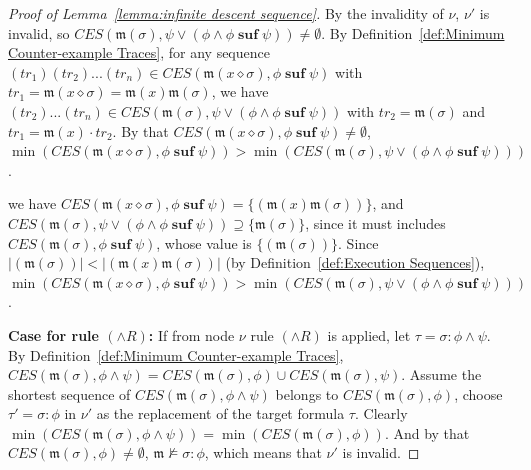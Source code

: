 \documentclass[manuscript,screen]{acmart}
\newcommand{\mfr}[1]{\mathfrak{#1}}
\newcommand{\lm}[0]{\mfr{m}}
\newcommand{\EX}[0]{\textit{CES}}
\newcommand{\cat}[0]{\diamond}
\DeclareMathOperator{\ofst}{\mathbf{f}}
\DeclareMathOperator{\osuf}{\mathbf{suf}}
\begin{document}
\begin{proof}[Proof of Lemma~\ref{lemma:infinite descent sequence}]
    By the invalidity of $\nu$, $\nu'$ is invalid, so $\EX(\lm(\sigma), \psi\vee (\phi\wedge \phi\osuf\psi))\neq \emptyset$. 
    By Definition~\ref{def:Minimum Counter-example Traces}, 
    for any sequence $(tr_1)(tr_2)...(tr_n)\in \EX(\lm(x\cat \sigma), \phi\osuf\psi)$ with $tr_1 = \lm(x\cat \sigma) = \lm(x)\lm(\sigma)$, 
    we have $(tr_2)...(tr_n)\in \EX(\lm(\sigma), \psi\vee (\phi\wedge \phi\osuf\psi))$ with $tr_2 = \lm(\sigma)$ and $tr_1 =\lm(x)\cdot tr_2$. 
    By that $\EX(\lm(x\cat \sigma), \phi\osuf\psi)\neq \emptyset$, $\min(\EX(\lm(x\cat \sigma), \phi\osuf\psi)) > \min(\EX(\lm(\sigma), \psi\vee (\phi\wedge \phi\osuf\psi)))$. 
    \fi

    \ifx
    we have $\EX(\lm(x\cat \sigma), \phi\osuf \psi) = \{(\lm(x)\lm(\sigma))\}$, and $\EX(\lm(\sigma), \psi\vee (\phi\wedge \phi\osuf \psi)) \supseteq \{\lm(\sigma)\}$, since it must includes $\EX(\lm(\sigma), \phi\osuf \psi)$, whose value is $\{(\lm(\sigma))\}$.  
    Since $|(\lm(\sigma))| < |(\lm(x)\lm(\sigma))|$ (by Definition~\ref{def:Execution Sequences}), 
    $\min(\EX(\lm(x\cat \sigma), \phi\osuf \psi)) > \min(\EX(\lm(\sigma), \psi\vee (\phi\wedge \phi\osuf \psi)))$. 
    \fi
    
\ifx
    \textbf{Case for rule $(\wedge R)$: }
    If from node $\nu$ rule $(\wedge R)$ is applied, let $\tau=\sigma : \phi\wedge \psi$. 
    By Definition~\ref{def:Minimum Counter-example Traces}, $\EX(\lm(\sigma), \phi\wedge \psi) = \EX(\lm(\sigma), \phi)\cup \EX(\lm(\sigma), \psi)$.  
    Assume the shortest sequence of $\EX(\lm(\sigma), \phi\wedge \psi)$ belongs to $\EX(\lm(\sigma), \phi)$, choose $\tau' = \sigma : \phi$ in $\nu'$ as the replacement of the target formula $\tau$. Clearly $\min(\EX(\lm(\sigma), \phi\wedge \psi)) = \min(\EX(\lm(\sigma), \phi))$. 
    And by that $\EX(\lm(\sigma), \phi)\neq\emptyset$, $\lm\not\models \sigma : \phi$, which means that $\nu'$ is invalid. 


\end{proof}
\end{document}
